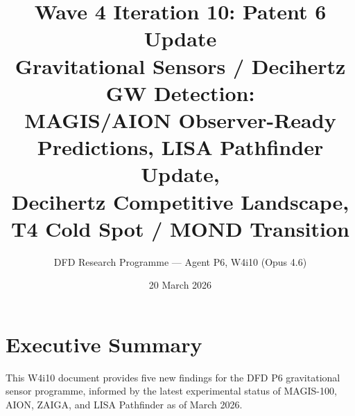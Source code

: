 \documentclass[11pt]{article}
\title{\textbf{Wave 4 Iteration 10: Patent 6 Update}\\[6pt]
Gravitational Sensors / Decihertz GW Detection:\\
MAGIS/AION Observer-Ready Predictions, LISA Pathfinder Update,\\
Decihertz Competitive Landscape, T4 Cold Spot / MOND Transition}
\author{DFD Research Programme --- Agent P6, W4i10 (Opus 4.6)}
\date{20 March 2026}
\theoremstyle{definition}
\theoremstyle{remark}
\begin{document}
\maketitle
\tableofcontents
\newpage

\section*{Executive Summary}

This W4i10 document provides five new findings for the DFD P6 gravitational
sensor programme, informed by the latest experimental status of MAGIS-100,
AION, ZAIGA, and LISA Pathfinder as of March 2026.
\end{document}
